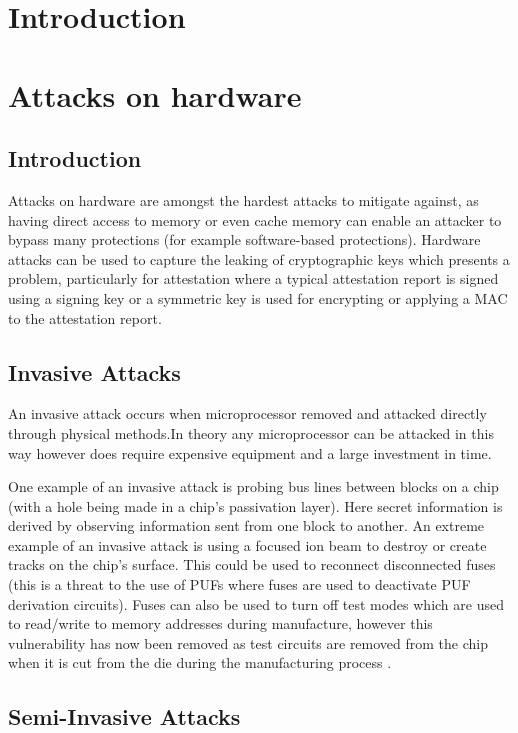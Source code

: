 \section{Introduction}
\section{Attacks on hardware}
\subsection{Introduction}

Attacks on hardware are amongst the hardest attacks to mitigate against, as having direct access to memory or even cache memory can enable an attacker to bypass many protections (for example software-based protections). Hardware attacks can be used to capture the leaking of cryptographic keys which presents a problem, particularly for attestation where a typical attestation report is signed using a signing key or a symmetric key is used for encrypting or applying a MAC to the attestation report.

\subsection{Invasive Attacks}
An invasive attack occurs when microprocessor removed and attacked directly through physical methods.In theory any microprocessor can be attacked in this way however does require expensive equipment and a large investment in time.

One example of an invasive attack is probing bus lines between blocks on a chip (with a hole being made in a chip's passivation layer). Here secret information is derived by observing information sent from one block to another. An extreme example of an invasive attack is using a focused ion beam to destroy or create tracks on the chip's surface. This could be used to reconnect disconnected fuses (this is a threat to the use of PUFs  where fuses are used to deactivate PUF derivation circuits). Fuses can also be used to turn off test modes which are used to read/write to memory addresses during manufacture, however this vulnerability has now been removed as test circuits are  removed from the chip when it is cut from the die during the manufacturing process \cite{Anderson1996} \cite{Kommerling1999}.

\subsection{Semi-Invasive Attacks}

